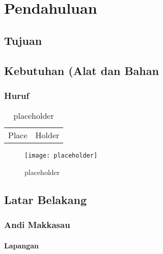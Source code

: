\documentclass[../thesis.tex]{subfiles}
\begin{document}
\chapter{Pendahuluan}\label{chap:pendahuluan}

\section{Tujuan}%
\label{sec:Tujuan}

\lipsum[1] \cite{muhadjir1996metodologi}

\section{Kebutuhan (Alat dan Bahan}%
\label{sec:Kebutuhan (Alat dan Bahan}

\lipsum[1] \cite{muhadjir1996metodologi}

\subsection{Huruf}%
\label{sub:Huruf}





\begin{table}[htpb]
	\centering
	\caption{placeholder}
	\label{tab:place}
	\begin{tabular}{l l}
		Place  &  Holder  \\
	\end{tabular}
\end{table}

\begin{figure}[htpb]
	\centering
	\texttt{[image: placeholder]}
	\caption{placeholder}
	\label{fig:placeholder}
\end{figure}

\section{Latar Belakang}

\subsection{Andi Makkasau}

\subsubsection{Lapangan}

\end{document}
